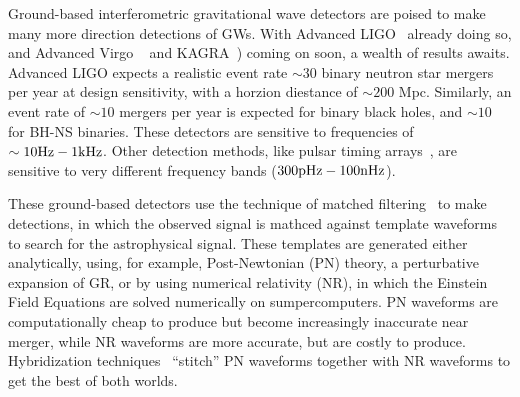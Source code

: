 Ground-based interferometric gravitational wave detectors are poised to make many more direction detections of GWs. With Advanced LIGO~\citep{aLIGO1,aLIGO2} already doing so, and Advanced Virgo ~\citep{AdV,TheVirgo:2014hva} and KAGRA~\cite{Somiya:2012}) coming on soon, a wealth of results awaits. Advanced LIGO expects a realistic event rate $\sim 30$ binary neutron star mergers per year at design sensitivity, with a horzion diestance of $\sim 200$ Mpc. Similarly, an event rate of $\sim 10$ mergers per year is expected for binary black holes, and $\sim 10$ for BH-NS binaries. These detectors are sensitive to frequencies of $\sim 10{\rm Hz} - 1{\rm kHz}$. Other detection methods, like pulsar timing arrays~\citep{Joshi:2013at}, are sensitive to very different frequency bands ($300{\rm pHz}-100{\rm nHz}$).

These ground-based detectors use the technique of matched filtering~\citep{Owen:1998dk} to make detections, in which the observed signal is mathced against template waveforms to search for the astrophysical signal. These templates are generated either analytically, using, for example, Post-Newtonian (PN) theory, a perturbative expansion of GR, or by using numerical relativity (NR), in which the Einstein Field Equations are solved numerically on sumpercomputers. PN waveforms are computationally cheap to produce but become increasingly inaccurate near merger, while NR waveforms are more accurate, but are costly to produce. Hybridization techniques~\citep{MacDonald:2012mp} ``stitch'' PN waveforms together with NR waveforms to get the best of both worlds.

